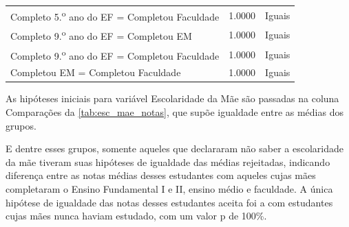 \begin{table}[htb]
\begin{tabular}{lcc}
    Completo 5.\textsuperscript{o} ano do EF = Completou Faculdade & 1.0000 & Iguais\\
    Completo 9.\textsuperscript{o} ano do EF = Completou EM & 1.0000 & Iguais\\
    Completo 9.\textsuperscript{o} ano do EF = Completou Faculdade & 1.0000 & Iguais\\
    Completou EM = Completou Faculdade & 1.0000 & Iguais\\
    \bottomrule
    \end{tabular}
    \centering
    
  \end{table}

As hipóteses iniciais para variável Escolaridade da Mãe são passadas na coluna Comparações da \autoref{tab:esc_mae_notas},
que supõe igualdade entre as médias dos grupos.

E dentre esses grupos, somente aqueles que declararam não saber a escolaridade da mãe tiveram suas hipóteses
de igualdade das médias rejeitadas, indicando diferença entre as notas médias desses estudantes com aqueles
cujas mães completaram o Ensino Fundamental I e II, ensino médio e faculdade. A única hipótese de igualdade
das notas desses estudantes aceita foi a com estudantes cujas mães nunca haviam estudado, com um valor p de 100\%.
